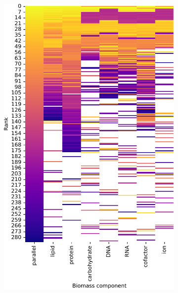 \begin{figure}
  \centering
  \begin{subfigure}[t]{0.45\textwidth}
  \centering
    \includegraphics[width=\linewidth]{CompareEnzUse_glc16p89_pyrUnres_ammUnres_1.pdf}
    \caption{
    }
    \label{fig:model-rank-glc-lowratio-rank}
  \end{subfigure}%
  \begin{subfigure}[t]{0.45\textwidth}
  \centering

\end{subfigure}
\end{figure}
